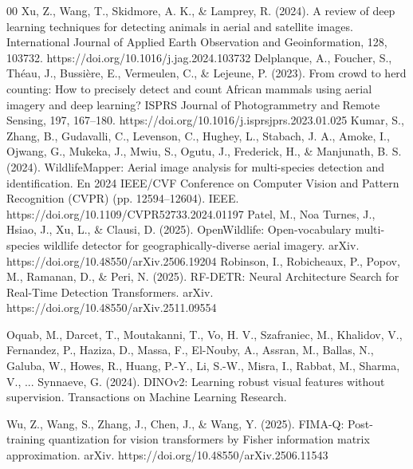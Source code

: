 \documentclass[conference]{IEEEtran}
\begin{document}
\begin{thebibliography}{00}
 Xu, Z., Wang, T., Skidmore, A. K., \& Lamprey, R. (2024). A review of deep learning techniques for detecting animals in aerial and satellite images. International Journal of Applied Earth Observation and Geoinformation, 128, 103732. https://doi.org/10.1016/j.jag.2024.103732
 Delplanque, A., Foucher, S., Théau, J., Bussière, E., Vermeulen, C., \& Lejeune, P. (2023). From crowd to herd counting: How to precisely detect and count African mammals using aerial imagery and deep learning? ISPRS Journal of Photogrammetry and Remote Sensing, 197, 167–180. https://doi.org/10.1016/j.isprsjprs.2023.01.025
 Kumar, S., Zhang, B., Gudavalli, C., Levenson, C., Hughey, L., Stabach, J. A., Amoke, I., Ojwang, G., Mukeka, J., Mwiu, S., Ogutu, J., Frederick, H., \& Manjunath, B. S. (2024). WildlifeMapper: Aerial image analysis for multi-species detection and identification. En 2024 IEEE/CVF Conference on Computer Vision and Pattern Recognition (CVPR) (pp. 12594–12604). IEEE. https://doi.org/10.1109/CVPR52733.2024.01197
 Patel, M., Noa Turnes, J., Hsiao, J., Xu, L., \& Clausi, D. (2025). OpenWildlife: Open-vocabulary multi-species wildlife detector for geographically-diverse aerial imagery. arXiv. https://doi.org/10.48550/arXiv.2506.19204
 Robinson, I., Robicheaux, P., Popov, M., Ramanan, D., \& Peri, N. (2025). RF-DETR: Neural Architecture Search for Real-Time Detection Transformers. arXiv. https://doi.org/10.48550/arXiv.2511.09554

 Oquab, M., Darcet, T., Moutakanni, T., Vo, H. V., Szafraniec, M., Khalidov, V., Fernandez, P., Haziza, D., Massa, F., El-Nouby, A., Assran, M., Ballas, N., Galuba, W., Howes, R., Huang, P.-Y., Li, S.-W., Misra, I., Rabbat, M., Sharma, V., ... Synnaeve, G. (2024). DINOv2: Learning robust visual features without supervision. Transactions on Machine Learning Research.

 Wu, Z., Wang, S., Zhang, J., Chen, J., \& Wang, Y. (2025). FIMA-Q: Post-training quantization for vision transformers by Fisher information matrix approximation. arXiv. https://doi.org/10.48550/arXiv.2506.11543


\end{thebibliography}
\end{document}
